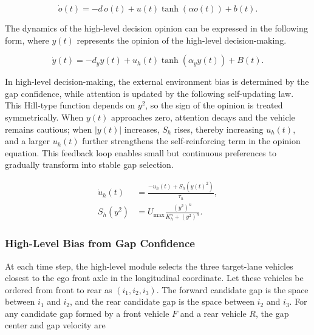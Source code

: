 {\small
\begin{equation}
\dot{o}(t) =
-d\,o(t)
+u(t)\tanh\!\left(\alpha o(t)\right)
+b(t).
\end{equation}
}





The dynamics of the high-level decision opinion can be expressed in the following form, where \(y(t)\) represents the opinion of the high-level decision-making.



{\small
\begin{equation}
\dot{y}(t) =
-d_y y(t)
+u_h(t)\tanh\!\left(\alpha_y y(t)\right)
+B(t).
\end{equation}
}





In high-level decision-making, the external environment bias is determined by the gap confidence, while attention is updated by the following self-updating law. This Hill-type function depends on \(y^2\), so the sign of the opinion is treated symmetrically. When \(y(t)\) approaches zero, attention decays and the vehicle remains cautious; when \(|y(t)|\) increases, \(S_h\) rises, thereby increasing \(u_h(t)\), and a larger \(u_h(t)\) further strengthens the self-reinforcing term in the opinion equation. This feedback loop enables small but continuous preferences to gradually transform into stable gap selection.



{\small
\begin{equation}
\begin{aligned}
\dot{u}_h(t) &= \frac{-u_h(t)+S_h(y(t)^2)}{\tau_h},\\
S_h(y^2) &= U_{\max}\frac{(y^2)^n}{K_h^n+(y^2)^n}.
\end{aligned}
\end{equation}
}





\subsubsection{High-Level Bias from Gap Confidence}





At each time step, the high-level module selects the three target-lane vehicles closest to the ego front axle in the longitudinal coordinate. Let these vehicles be ordered from front to rear as \((i_1,i_2,i_3)\). The forward candidate gap is the space between \(i_1\) and \(i_2\), and the rear candidate gap is the space between \(i_2\) and \(i_3\). For any candidate gap formed by a front vehicle \(F\) and a rear vehicle \(R\), the gap center and gap velocity are



